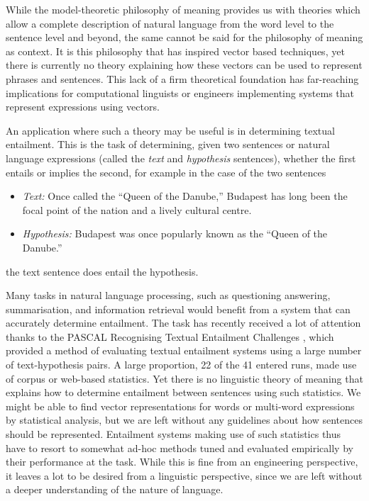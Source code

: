 \documentclass[12pt]{report}
\begin{document}
While the model-theoretic philosophy of meaning provides us with theories which allow a complete description of natural language from the word level to the sentence level and beyond, the same cannot be said for the philosophy of meaning as context. It is this philosophy that has inspired vector based techniques, yet there is currently no theory explaining how these vectors can be used to represent phrases and sentences. This lack of a firm theoretical foundation has far-reaching implications for computational linguists or engineers implementing systems that represent expressions using vectors.

An application where such a theory may be useful is in determining textual entailment. This is the task of determining, given two sentences or natural language expressions (called the \emph{text} and \emph{hypothesis} sentences), whether the first entails or implies the second, for example in the case of the two sentences
\begin{itemize}
\item \emph{Text:} Once called the ``Queen of the Danube,'' Budapest has long been the focal point of the nation and a lively cultural centre.
\item \emph{Hypothesis:} Budapest was once popularly known as the ``Queen of the Danube.''
\end{itemize}
the text sentence does entail the hypothesis.

Many tasks in natural language processing, such as questioning answering, summarisation, and information retrieval would benefit from a system that can accurately determine entailment. The task has recently received a lot of attention thanks to the PASCAL Recognising Textual Entailment Challenges \citep{Dagan:05,Bar-Haim:06}, which provided a method of evaluating textual entailment systems using a large number of text-hypothesis pairs. A large proportion, 22 of the 41 entered runs, made use of corpus or web-based statistics. Yet there is no linguistic theory of meaning that explains how to determine entailment between sentences using such statistics. We might be able to find vector representations for words or multi-word expressions by statistical analysis, but we are left without any guidelines about how sentences should be represented. Entailment systems making use of such statistics thus have to resort to somewhat ad-hoc methods tuned and evaluated empirically by their performance at the task. While this is fine from an engineering perspective, it leaves a lot to be desired from a linguistic perspective, since we are left without a deeper understanding of the nature of language.
\end{document}
